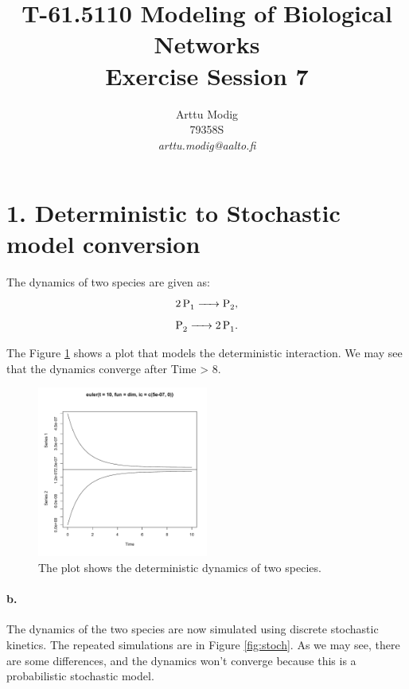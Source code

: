 \documentclass[a4paper,english]{article}
\title{T-61.5110 Modeling of Biological Networks \\ Exercise Session 7}
\author{Arttu Modig \\ 79358S \\
       {\it arttu.modig@aalto.fi}}
\begin{document}
\maketitle


\onehalfspacing
\section*{1. Deterministic to Stochastic model conversion}

The dynamics of two species are given as:
\[ \ce{2P1 -> P2} ,\]
\[ \ce{P2 -> 2P1} .\]

The Figure \ref{fig:dimer} shows a plot that models the deterministic interaction. We may see that the dynamics converge after Time > 8.

\begin{figure}[htp]
    \begin{center}
        \includegraphics[width=0.5\textwidth]{dimer}
        \caption{The plot shows the deterministic dynamics of two species.}
        \label{fig:dimer}
    \end{center}
\end{figure}

\paragraph{b.}

The dynamics of the two species are now simulated using discrete stochastic kinetics. The repeated simulations are in Figure \ref{fig:stoch}. As we may see, there are some differences, and the dynamics won't converge because this is a probabilistic stochastic model.
\end{document}

